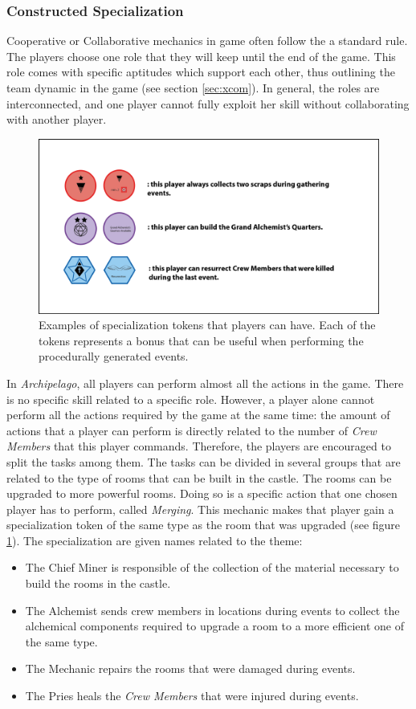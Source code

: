 \subsubsection{Constructed Specialization}
Cooperative or Collaborative mechanics in game often follow the a standard rule. The players choose one role that they will keep until the end of the game. This role comes with specific aptitudes which support each other, thus outlining the team dynamic in the game (see section \ref{sec:xcom}). In general, the roles are interconnected, and one player cannot fully exploit her skill without collaborating with another player.
\begin{figure}[h]
    \centering
    \includegraphics[width=\textwidth]{Images/Specialization.png}
    \caption{Examples of specialization tokens that players can have. Each of the tokens represents a bonus that can be useful when performing the procedurally generated events.}
    \label{fig:spec}
\end{figure}
In \textit{Archipelago}, all players can perform almost all the actions in the game. There is no specific skill related to a specific role. However, a player alone cannot perform all the actions required by the game at the same time: the amount of actions that a player can perform is directly related to the number of \textit{Crew Members} that this player commands. Therefore, the players are encouraged to split the tasks among them. The tasks can be divided in several groups that are related to the type of rooms that can be built in the castle. The rooms can be upgraded to more powerful rooms. Doing so is a specific action that one chosen player has to perform, called \textit{Merging}. This mechanic makes that player gain a specialization token of the same type as the room that was upgraded (see figure \ref{fig:spec}). The specialization are given names related to the theme:
\begin{itemize}
\item The Chief Miner is responsible of the collection of the material necessary to build the rooms in the castle. 
\item The Alchemist sends crew members in locations during events to collect the alchemical components required to upgrade a room to a more efficient one of the same type.
\item The Mechanic repairs the rooms that were damaged during events.
\item The Pries heals the \textit{Crew Members} that were injured during events.
\end{itemize}
